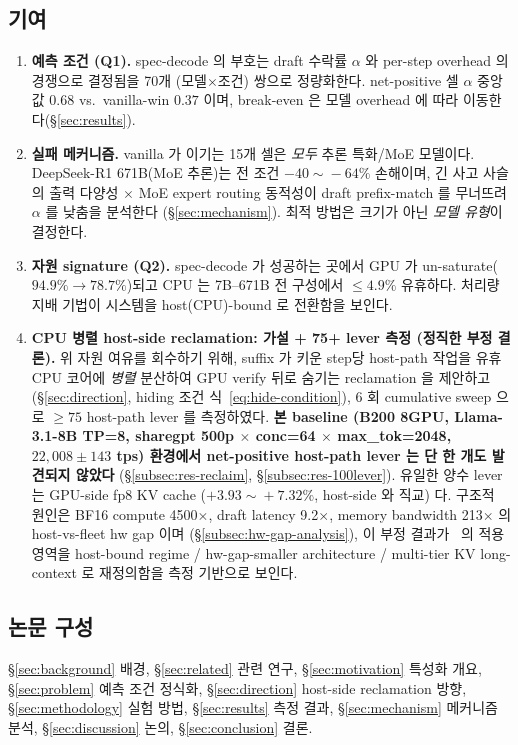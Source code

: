 \subsection{기여}

\begin{enumerate}
\item \textbf{예측 조건 (Q1).}
  spec-decode 의 부호는 draft 수락률 $\alpha$ 와 per-step overhead 의 경쟁으로
  결정됨을 70개 (모델$\times$조건) 쌍으로 정량화한다.
  net-positive 셀 $\alpha$ 중앙값 $0.68$ vs.\ vanilla-win $0.37$ 이며,
  break-even 은 모델 overhead 에 따라 이동한다(\S\ref{sec:results}).

\item \textbf{실패 메커니즘.}
  vanilla 가 이기는 15개 셀은 \emph{모두} 추론 특화/MoE 모델이다.
  DeepSeek-R1 671B(MoE 추론)는 전 조건 $-40\!\sim\!-64\%$ 손해이며,
  긴 사고 사슬의 출력 다양성 $\times$ MoE expert routing 동적성이
  draft prefix-match 를 무너뜨려 $\alpha$ 를 낮춤을 분석한다
  (\S\ref{sec:mechanism}). 최적 방법은 크기가 아닌 \emph{모델 유형}이 결정한다.

\item \textbf{자원 signature (Q2).}
  spec-decode 가 성공하는 곳에서 GPU 가 un-saturate($94.9\%\!\to\!78.7\%$)되고
  CPU 는 7B--671B 전 구성에서 $\le4.9\%$ 유휴하다.
  처리량 지배 기법이 시스템을 host(CPU)-bound 로 전환함을 보인다.

\item \textbf{CPU 병렬 host-side reclamation: 가설 + 75+ lever 측정 (정직한 부정 결론).}
  위 자원 여유를 회수하기 위해, suffix 가 키운 step당 host-path 작업을
  유휴 CPU 코어에 \emph{병렬} 분산하여 GPU verify 뒤로 숨기는
  reclamation 을 제안하고(\S\ref{sec:direction}, hiding 조건 식~\ref{eq:hide-condition}),
  6 회 cumulative sweep 으로 $\ge\!75$ host-path lever 를 측정하였다.
  \textbf{본 baseline (B200 8GPU, Llama-3.1-8B TP=8, sharegpt 500p $\times$ conc=64 $\times$ max\_tok=2048,
  $22{,}008\!\pm\!143$ tps) 환경에서 net-positive host-path lever 는 단 한 개도 발견되지 않았다}
  (\S\ref{subsec:res-reclaim}, \S\ref{subsec:res-100lever}).
  유일한 양수 lever 는 GPU-side fp8 KV cache ($+3.93\!\sim\!+7.32\%$, host-side 와 직교) 다.
  구조적 원인은 BF16 compute 4500$\times$, draft latency 9.2$\times$, memory bandwidth 213$\times$ 의
  host-vs-fleet hw gap 이며 (\S\ref{subsec:hw-gap-analysis}), 이 부정 결과가
  \algname\ 의 적용 영역을 host-bound regime / hw-gap-smaller architecture / multi-tier KV long-context
  로 재정의함을 측정 기반으로 보인다.
\end{enumerate}

\subsection{논문 구성}
\S\ref{sec:background} 배경,
\S\ref{sec:related} 관련 연구,
\S\ref{sec:motivation} 특성화 개요,
\S\ref{sec:problem} 예측 조건 정식화,
\S\ref{sec:direction} host-side reclamation 방향,
\S\ref{sec:methodology} 실험 방법,
\S\ref{sec:results} 측정 결과,
\S\ref{sec:mechanism} 메커니즘 분석,
\S\ref{sec:discussion} 논의,
\S\ref{sec:conclusion} 결론.
